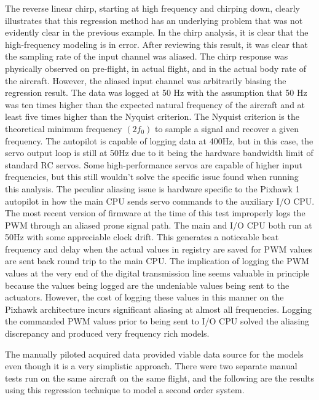 The reverse linear chirp, starting at high frequency and chirping down, clearly illustrates that this regression method has an underlying problem that was not evidently clear in the previous example.  In the chirp analysis, it is clear that the high-frequency modeling is in error.  After reviewing this result, it was clear that the sampling rate of the input channel was aliased.  The chirp response was physically observed on pre-flight, in actual flight, and in the actual body rate of the aircraft.  However, the aliased input channel was arbitrarily biasing the regression result.  The data was logged at 50 Hz with the assumption that 50 Hz was ten times higher than the expected natural frequency of the aircraft and at least five times higher than the Nyquist criterion.  The Nyquist criterion is the theoretical minimum frequency $(2f_0)$ to sample a signal and recover a given frequency.  The autopilot is capable of logging data at 400Hz, but in this case, the servo output loop is still at 50Hz due to it being the hardware bandwidth limit of standard \ac{RC} servos.  Some high-performance servos are capable of higher input frequencies, but this still wouldn't solve the specific issue found when running this analysis.  The peculiar aliasing issue is hardware specific to the Pixhawk 1 autopilot in how the main CPU sends servo commands to the auxiliary I/O  CPU.  The most recent version of firmware at the time of this test improperly logs the \ac{PWM} through an aliased prone signal path.  The main and I/O CPU both run at 50Hz with some appreciable clock drift.  This generates a noticeable beat frequency and delay when the actual values in registry are saved for \ac{PWM} values are sent back round trip to the main CPU.  The implication of logging the \ac{PWM} values at the very end of the digital transmission line seems valuable in principle because the values being logged are the undeniable values being sent to the actuators.  However, the cost of logging these values in this manner on the Pixhawk architecture incurs significant aliasing at almost all frequencies.  Logging the commanded \ac{PWM} values prior to being sent to I/O CPU solved the aliasing discrepancy and produced very frequency rich models.

The manually piloted acquired data provided viable data source for the models even though it is a very simplistic approach.  There were two separate manual tests run on the same aircraft on the same flight, and the following are the results using this regression technique to model a second order system.

